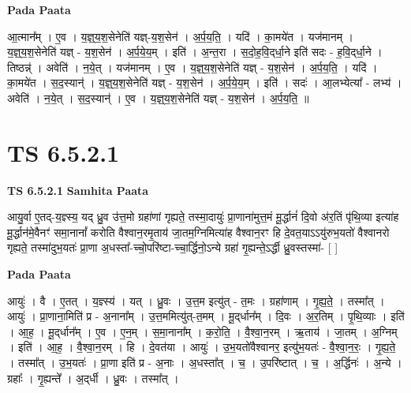 \documentclass[17pt]{extarticle}
\begin{document}
\textbf{Pada Paata} \newline

आ॒त्मान᳚म् । ए॒व । य॒ज्ञ्॒य॒श॒सेनेति॑ यज्ञ्-य॒श॒सेन॑ । अ॒र्प॒य॒ति॒ । यदि॑ । का॒मये॑त । यज॑मानम् । य॒ज्ञ्॒य॒श॒सेनेति॑ यज्ञ् - य॒श॒सेन॑ । अ॒र्प॒ये॒य॒म् । इति॑ । अ॒न्त॒रा । स॒दो॒ह॒वि॒द्‌र्धा॒ने इति॑ सदः - ह॒वि॒द्‌र्धा॒ने । तिष्ठन्न्॑ । अवेति॑ । न॒ये॒त् । यज॑मानम् । ए॒व । य॒ज्ञ्॒य॒श॒सेनेति॑ यज्ञ् - य॒श॒सेन॑ । अ॒र्प॒य॒ति॒ । यदि॑ । का॒मये॑त । स॒द॒स्यान्॑ । य॒ज्ञ्॒य॒श॒सेनेति॑ यज्ञ् - य॒श॒सेन॑ । अ॒र्प॒ये॒य॒म् । इति॑ । सदः॑ । आ॒लभ्येत्या᳚ - लभ्य॑ । अवेति॑ । न॒ये॒त् । स॒द॒स्यान्॑ । ए॒व । य॒ज्ञ्॒य॒श॒सेनेति॑ यज्ञ् - य॒श॒सेन॑ । अ॒र्प॒य॒ति॒ ॥  \newline





\section{ TS 6.5.2.1 }

\textbf{TS 6.5.2.1 } \newline
\textbf{Samhita Paata} \newline

आयु॒र्वा ए॒तद्-य॒ज्ञ्स्य॒ यद् ध्रु॒व उ॑त्त॒मो ग्रहा॑णां गृह्यते॒ तस्मा॒दायुः॑ प्रा॒णाना॑मुत्त॒मं मू॒र्द्धानं॑ दि॒वो अ॑र॒तिं पृ॑थि॒व्या इत्या॑ह मू॒र्द्धान॑मे॒वैनꣳ॑ समा॒नानां᳚ करोति वैश्वान॒रमृ॒ताय॑ जा॒तम॒ग्निमित्या॑ह वैश्वान॒रꣳ हि दे॒वत॒याऽऽयु॑रुभ॒यतो॑ वैश्वानरो गृह्यते॒ तस्मा॑दुभ॒यतः॑ प्रा॒णा अ॒धस्ता᳚-च्चो॒परि॑ष्टा-च्चा॒र्द्धिनो॒ऽन्ये ग्रहा॑ गृ॒ह्यन्ते॒ऽर्द्धी ध्रु॒वस्तस्मा॑- [  ] \newline

\textbf{Pada Paata} \newline

आयुः॑ । वै । ए॒तत् । य॒ज्ञ्स्य॑ । यत् । ध्रु॒वः । उ॒त्त॒म इत्यु॑त् - त॒मः । ग्रहा॑णाम् । गृ॒ह्य॒ते॒ । तस्मा᳚त् । आयुः॑ । प्रा॒णाना॒मिति॑ प्र - अ॒नाना᳚म् । उ॒त्त॒ममित्यु॑त्-त॒मम् । मू॒द्‌र्धान᳚म् । दि॒वः । अ॒र॒तिम् । पृ॒थि॒व्याः । इति॑ । आ॒ह॒ । मू॒द्‌र्धान᳚म् । ए॒व । ए॒न॒म् । स॒मा॒नाना᳚म् । क॒रो॒ति॒ । वै॒श्वा॒न॒रम् । ऋ॒ताय॑ । जा॒तम् । अ॒ग्निम् । इति॑ । आ॒ह॒ । वै॒श्वा॒न॒रम् । हि । दे॒वत॑या । आयुः॑ । उ॒भ॒यतो॑वैश्वानर॒ इत्यु॑भ॒यतः॑ - वै॒श्वा॒न॒रः॒ । गृ॒ह्य॒ते॒ । तस्मा᳚त् । उ॒भ॒यतः॑ । प्रा॒णा इति॑ प्र - अ॒नाः । अ॒धस्ता᳚त् । च॒ । उ॒परि॑ष्टात् । च॒ । अ॒र्द्धिनः॑ । अ॒न्ये । ग्रहाः᳚ । गृ॒ह्यन्ते᳚ । अ॒द्‌र्धी । ध्रु॒वः । तस्मा᳚त् ।  \newline
\end{document}
